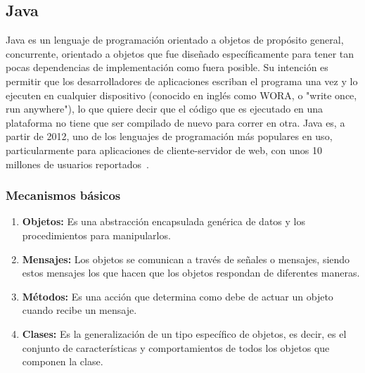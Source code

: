 \subsection{Java}
Java es un lenguaje de programación orientado a objetos de propósito
 general, concurrente,  orientado a objetos que fue diseñado
 específicamente para tener tan pocas dependencias de implementación
 como fuera posible. Su intención es permitir que los desarrolladores
 de aplicaciones escriban el programa una vez y lo ejecuten en 
cualquier dispositivo (conocido en inglés como WORA, o 
"write once, run anywhere"), lo que quiere decir que el código
 que es ejecutado en una plataforma no tiene que ser compilado de
 nuevo para correr en otra. Java es, a partir de 2012, uno de los
 lenguajes de programación más populares en uso, particularmente
 para aplicaciones de cliente-servidor de web, con unos 10 millones
 de usuarios reportados~\cite{JAVA}.
\subsubsection{Mecanismos básicos}
\begin{enumerate}
\item \textbf{Objetos:}
 Es una abstracción encapsulada genérica de datos y los procedimientos
 para manipularlos.
\item \textbf{Mensajes:}
Los objetos se comunican a través de señales o mensajes, siendo estos
 mensajes los que hacen que los objetos respondan de diferentes maneras.
\item \textbf{Métodos:}
Es una acción que determina como debe de actuar un objeto cuando 
recibe un mensaje.
\item \textbf{Clases:}
Es la generalización de un tipo específico de objetos, es decir, es el 
conjunto de características y comportamientos de todos los objetos 
que componen la clase.
\end{enumerate}
